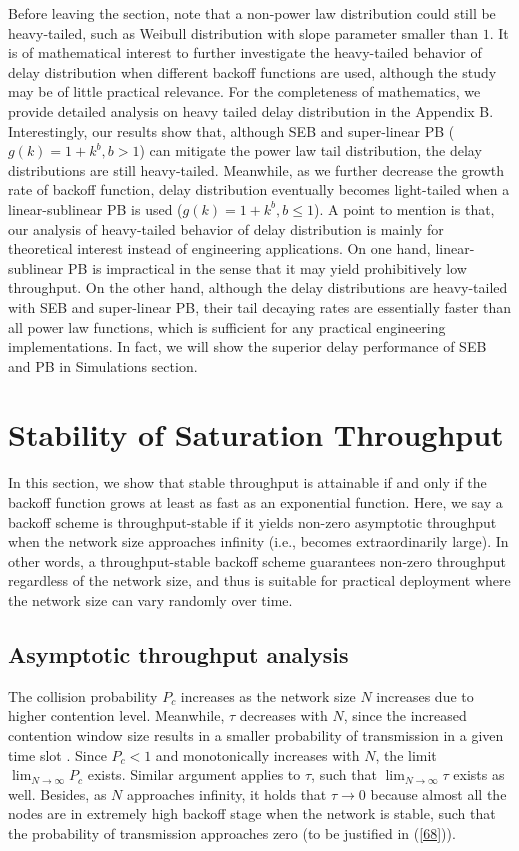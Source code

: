 \documentclass[journal]{IEEEtran}
\begin{document}
Before leaving the section, note that a non-power law distribution could still be heavy-tailed, such as Weibull distribution with slope parameter smaller than $1$. It is of mathematical interest to further investigate the heavy-tailed behavior of delay distribution when different backoff functions are used, although the study may be of little practical relevance. For the completeness of mathematics, we provide detailed analysis on heavy tailed delay distribution in the Appendix B. Interestingly, our results show that, although SEB and super-linear PB ($g(k)=1+k^b,b>1$) can mitigate the power law tail distribution, the delay distributions are still heavy-tailed. Meanwhile, as we further decrease the growth rate of backoff function, delay distribution eventually becomes light-tailed when a linear-sublinear PB is used ($g(k)=1+k^b,b\leq1$). A point to mention is that, our analysis of heavy-tailed behavior of delay distribution is mainly for theoretical interest instead of engineering applications. On one hand, linear-sublinear PB is impractical in the sense that it may yield prohibitively low throughput. On the other hand, although the delay distributions are heavy-tailed with SEB and super-linear PB, their tail decaying rates are essentially faster than all power law functions, which is sufficient for any practical engineering implementations. In fact, we will show the superior delay performance of SEB and PB in Simulations section.

\section{Stability of Saturation Throughput}
In this section, we show that stable throughput is attainable if and only if the backoff function grows at least as fast as an exponential function. Here, we say a backoff scheme is throughput-stable if it yields non-zero asymptotic throughput when the network size approaches infinity (i.e., becomes extraordinarily large). In other words, a throughput-stable backoff scheme guarantees non-zero throughput regardless of the network size, and thus is suitable for practical deployment where the network size can vary randomly over time.

\subsection{Asymptotic throughput analysis}
The collision probability $P_c$ increases as the network size $N$ increases due to higher contention level. Meanwhile, $\tau$ decreases with $N$, since the increased contention window size results in a smaller probability of transmission in a given time slot \cite{2005:Kwok}. Since $P_c<1$ and monotonically increases with $N$, the limit $\lim_{N\rightarrow \infty}P_c$ exists. Similar argument applies to $\tau$, such that $\lim_{N\rightarrow \infty}\tau$ exists as well. Besides, as $N$ approaches infinity, it holds that $\tau\rightarrow 0$ because almost all the nodes are in extremely high backoff stage when the network is stable, such that the probability of transmission approaches zero (to be justified in (\ref{68})).
\end{document}
